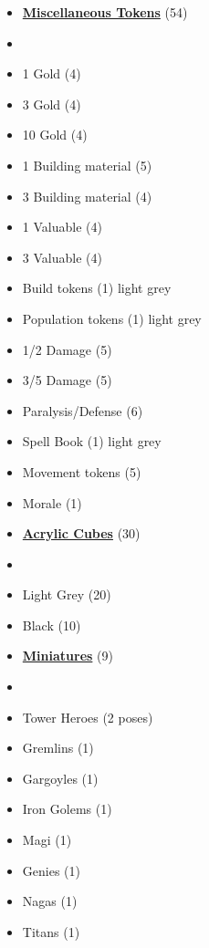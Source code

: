\begin{multicols}{3}
\begin{itemize}[leftmargin=0pt, label={}, noitemsep]
  \item \textbf{\small{\underline{Miscellaneous Tokens}}} (54)
  \item
  \item 1 Gold (4)
  \item 3 Gold (4)
  \item 10 Gold (4)
  \item 1 Building material (5)
  \item 3 Building material (4)
  \item 1 Valuable (4)
  \item 3 Valuable (4)
  \item Build tokens (1) {light grey}
  \item Population tokens (1) {light grey}
  \item 1/2 Damage (5)
  \item 3/5 Damage (5)
  \item Paralysis/Defense (6)
  \item Spell Book (1) {light grey}
  \item Movement tokens (5)
  \item Morale (1)
\end{itemize}

\begin{itemize}[leftmargin=0pt, label={}, noitemsep]
  \item \textbf{\small{\underline{Acrylic Cubes}}} (30)
  \item
  \item Light Grey (20)
  \item Black (10)
\end{itemize}
\columnbreak
\begin{itemize}[leftmargin=0pt, label={}, noitemsep]
  \item \textbf{\small{\underline{Miniatures}}} (9)
  \item
  \item Tower Heroes (2 poses)
  \item Gremlins (1)
  \item Gargoyles (1)
  \item Iron Golems (1)
  \item Magi (1)
  \item Genies (1)
  \item Nagas (1)
  \item Titans (1)
\end{itemize}


\end{multicols}
